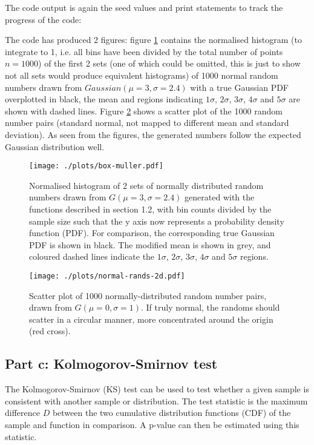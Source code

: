 \documentclass{article}
\begin{document}
The code output is again the seed values and print statements to track the progress of the code:


The code has produced 2 figures: figure \ref{fig:BM} contains the normalised histogram (to integrate to 1, i.e. all bins have been divided by the total number of points $n=1000$) of the first 2 sets (one of which could be omitted, this is just to show not all sets would produce equivalent histograms) of 1000 normal random numbers drawn from $Gaussian(\mu=3, \sigma=2.4)$ with a true Gaussian PDF overplotted in black, the mean and regions indicating $1\sigma$, $2\sigma$, $3\sigma$, $4\sigma$ and $5\sigma$ are shown with dashed lines. Figure \ref{fig:G2D} shows a scatter plot of the 1000 random number pairs (standard normal, not mapped to different mean and standard deviation). As seen from the figures, the generated numbers follow the expected Gaussian distribution well. 

\begin{figure}
	\centering
	\texttt{[image: ./plots/box-muller.pdf]}
	\caption{Normalised histogram of 2 sets of normally distributed random numbers drawn from $G(\mu=3, \sigma=2.4)$ generated with the functions described in section 1.2, with bin counts divided by the sample size such that the y axis now represents a probability density function (PDF). For comparison, the corresponding true Gaussian PDF is shown in black. The modified mean is shown in grey, and coloured dashed lines indicate the $1\sigma$, $2\sigma$, $3\sigma$, $4\sigma$ and $5\sigma$ regions.}
	\label{fig:BM}
\end{figure}

\begin{figure}
	\centering
	\texttt{[image: ./plots/normal-rands-2d.pdf]}
	\caption{Scatter plot of 1000 normally-distributed random number pairs, drawn from $G(\mu=0, \sigma=1)$. If truly normal, the randoms should scatter in a circular manner, more concentrated around the origin (red cross).}
	\label{fig:G2D}
\end{figure}

\subsection{Part c: Kolmogorov-Smirnov test}
The Kolmogorov-Smirnov (KS) test can be used to test whether a given sample is consistent with another sample or distribution. The test statistic is the maximum difference $D$ between the two cumulative distribution functions (CDF) of the sample and function in comparison. A p-value can then be estimated using this statistic.
\end{document}
